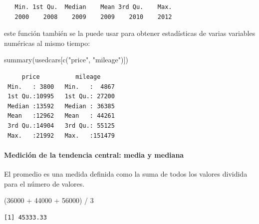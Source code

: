 \documentclass[
  letterpaper,
  DIV=11,
  numbers=noendperiod]{scrartcl}
\let\oldparagraph\paragraph
\renewcommand{\paragraph}[1]{\oldparagraph{#1}\mbox{}}
\newenvironment{Shaded}{\begin{snugshade}}{\end{snugshade}}
\newcommand{\DecValTok}[1]{\textcolor[rgb]{0.68,0.00,0.00}{#1}}
\newcommand{\FunctionTok}[1]{\textcolor[rgb]{0.28,0.35,0.67}{#1}}
\newcommand{\NormalTok}[1]{\textcolor[rgb]{0.00,0.23,0.31}{#1}}
\newcommand{\SpecialCharTok}[1]{\textcolor[rgb]{0.37,0.37,0.37}{#1}}
\newcommand{\StringTok}[1]{\textcolor[rgb]{0.13,0.47,0.30}{#1}}
\begin{document}
\begin{Shaded}
\end{Shaded}

\begin{verbatim}
   Min. 1st Qu.  Median    Mean 3rd Qu.    Max. 
   2000    2008    2009    2009    2010    2012 
\end{verbatim}

este función también se la puede usar para obtener estadísticas de
varias variables numéricas al mismo tiempo:

\begin{Shaded}
\begin{Highlighting}[]
\FunctionTok{summary}\NormalTok{(usedcars[}\FunctionTok{c}\NormalTok{(}\StringTok{"price"}\NormalTok{, }\StringTok{"mileage"}\NormalTok{)])}
\end{Highlighting}
\end{Shaded}

\begin{verbatim}
     price          mileage      
 Min.   : 3800   Min.   :  4867  
 1st Qu.:10995   1st Qu.: 27200  
 Median :13592   Median : 36385  
 Mean   :12962   Mean   : 44261  
 3rd Qu.:14904   3rd Qu.: 55125  
 Max.   :21992   Max.   :151479  
\end{verbatim}

\hypertarget{mediciuxf3n-de-la-tendencia-central-media-y-mediana}{%
\paragraph{Medición de la tendencia central: media y
mediana}\label{mediciuxf3n-de-la-tendencia-central-media-y-mediana}}

El promedio es una medida definida como la suma de todos los valores
dividida para el número de valores.

\begin{Shaded}
\begin{Highlighting}[]
\NormalTok{(}\DecValTok{36000} \SpecialCharTok{+} \DecValTok{44000} \SpecialCharTok{+} \DecValTok{56000}\NormalTok{) }\SpecialCharTok{/} \DecValTok{3}
\end{Highlighting}
\end{Shaded}

\begin{verbatim}
[1] 45333.33
\end{verbatim}
\end{document}
